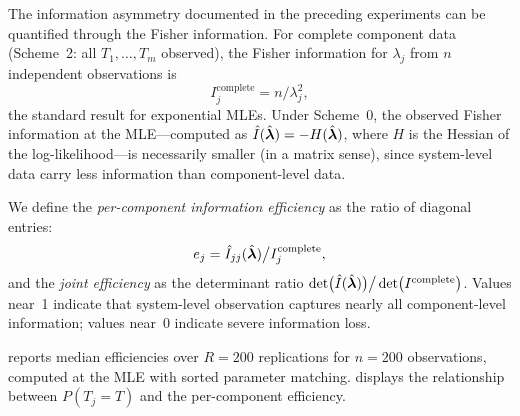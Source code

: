 The information asymmetry documented in the preceding experiments can be
quantified through the Fisher information.  For complete component data
(Scheme~2: all $T_1, \ldots, T_m$ observed), the Fisher information
for $\lambda_j$ from $n$ independent observations is
\begin{equation}\label{eq:fisher-complete}
  I_j^{\mathrm{complete}} = n / \lambda_j^2,
\end{equation}
the standard result for exponential MLEs.  Under Scheme~0, the observed
Fisher information at the MLE---computed as $\hat{I}(\hat{\boldsymbol{\lambda}}) =
-H(\hat{\boldsymbol{\lambda}})$, where $H$ is the Hessian of the log-likelihood---is
necessarily smaller (in a matrix sense), since system-level data carry
less information than component-level data.

We define the \emph{per-component information efficiency} as the ratio of
diagonal entries:
\begin{equation}\label{eq:efficiency}
  e_j = \hat{I}_{jj}(\hat{\boldsymbol{\lambda}}) \big/ I_j^{\mathrm{complete}},
\end{equation}
and the \emph{joint efficiency} as the determinant ratio
$\det\bigl(\hat{I}(\hat{\boldsymbol{\lambda}})\bigr) \big/ \det\bigl(I^{\mathrm{complete}}\bigr)$.
Values near~1 indicate that system-level observation captures nearly all
component-level information; values near~0 indicate severe information
loss.

 reports median efficiencies over $R = 200$
replications for $n = 200$ observations, computed at the MLE with sorted
parameter matching.   displays the
relationship between $P(T_j = T)$ and the per-component efficiency.


